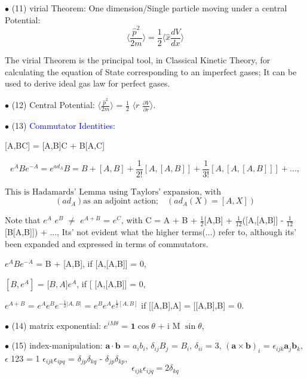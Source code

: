 \documentclass[a4paper, 10pt, onepage]{elegantbook}
\begin{document}
{$\bullet$ (11) virial Theorem: One dimension/Single particle moving under a central Potential:
\begin{equation} \label{eq:virial Theorem}
\langle \frac{\hat{p}^2}{2m} \rangle = \frac{1}{2} \langle \hat{x}  \frac{dV}{dx} \rangle
\end{equation}
\noindent

The virial Theorem is the principal tool, in Classical Kinetic Theory, for calculating the equation of State 
corresponding to an imperfect gases; It can be used to derive ideal gas law for perfect gases.  

$\bullet$ (12) Central Potential: $\langle \frac{\hat{p}^2}{2m} \rangle$ = $\frac{1}{2}$ $\langle{r}$ 
$\frac{\partial{V}}{\partial{r}} \rangle $.  

$\bullet$ (13) \textcolor{blue}{Commutator Identities:} 

[A,BC] = [A,B]C + B[A,C] 

\begin{equation} \label{eq:adjoint-action}
e^A Be^{-A} = e^{ad_A}B = B + [A,B] + \frac{1}{2!} [A,[A,B]] + \frac{1}{3!} [A,[A,[A,B]]] +...,
\end{equation}
 
$\text{This is Hadamards' Lemma using Taylors' expansion, with}$
\begin{equation}
(ad_A) \text{as an adjoint action;}\quad (ad_A(X) = [A,X])
\end{equation}

Note that $e^A$ $e^B$ $\neq$ $e^{A + B}$ = $e^C$, with C = A + B + $\frac{1}{2}$[A,B] + $\frac{1}{12}$([A,[A,B]] - 
$\frac{1}{12}$[B[A,B]]) + ...,
Its' not evident what the higher terms(...) refer to, although its' been expanded and expressed in terms of 
commutators. 
 
$e^A Be^{-A}$ = B + [A,B], if  [A,[A,B]] = 0, 

$[B,e^A]$ = [$B,A]e^A$, if [ [A,[A,B]] = 0, 
 
$e^{A + B}$ = $e^A e^B e^{-\frac{1}{2}|A,B|}$ = $e^B e^A e^{\frac{1}{2}[A,B]}$ if [[A,B],A] = [[A,B],B] = 0. 

$\bullet$ (14) matrix exponential: $e^{i M \theta}$ = $\mathbf{1} \cos \theta$ + i M $\sin 
\theta$,  

$\bullet$ (15) index-manipulation:  
$\mathbf a \cdot \mathbf b$ = $a_i b_i$,  
$\delta_{ij} B_j$ = $B_i$, $\delta_{ii}$ = 3, 
${(\mathbf a \times \mathbf b)}_i$ = $\epsilon_{ijk} \mathbf a_j \mathbf b_k$, $\epsilon$ 123 = 1  
$\epsilon_{ijk} \epsilon_{ipq}$ = $\delta_{jp} \delta_{kq}$ - $\delta_{jp} \delta_{kp}$,
\begin{equation}
\epsilon_{ijk} \epsilon_{ijq} = 2 \delta_{kq}
\end{equation}

}
\end{document}
